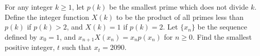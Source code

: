 For any integer $k\ge1$,  let $p(k)$ be the smallest prime which does not divide $k$. Define the integer function $X(k)$ to be the product of all primes less than $p(k)$ if $p(k)>2$,  and $X(k)=1$ if $p(k)=2$. Let $\{x_n\}$ be the sequence defined by $x_0=1$,  and $x_{n+1}X(x_n)=x_np(x_n)$ for $n\ge0$. Find the smallest positive integer, $t$ such that $x_t=2090$.